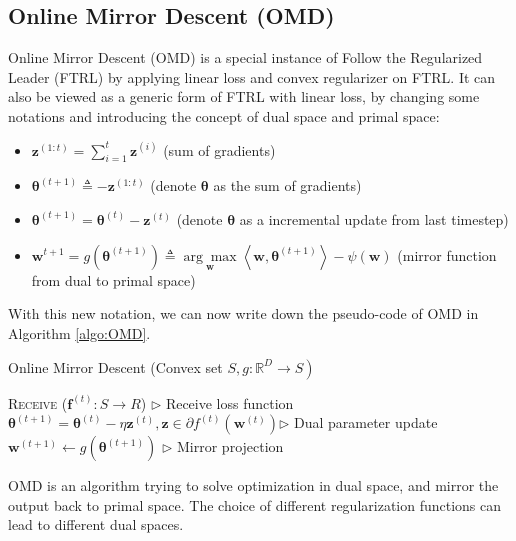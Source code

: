 \documentclass[11pt]{article}
\begin{document}
\subsection{Online Mirror Descent (OMD)}
Online Mirror Descent (OMD) is a special instance of Follow the Regularized Leader (FTRL) by applying linear loss and convex regularizer on FTRL. It can also be viewed as a generic form of FTRL with linear loss, by changing some notations and introducing the concept of dual space and primal space:
\begin{itemize}
    \item $\boldsymbol{z}^{(1: t)}=\sum_{i=1}^{t} \boldsymbol{z}^{(i)}$ (sum of gradients)
    \item $\boldsymbol{\theta}^{(t+1)} \triangleq-\boldsymbol{z}^{(1: t)}$ (denote $\boldsymbol{\theta}$ as the sum of gradients)
    \item $\boldsymbol{\theta}^{(t+1)}=\boldsymbol{\theta}^{(t)}-\boldsymbol{z}^{(t)}$ (denote $\boldsymbol{\theta}$ as a incremental update from last timestep)
    \item $\boldsymbol{w}^{t+1} = g\left(\boldsymbol{\theta}^{(t+1)}\right) \triangleq \underset{\boldsymbol{w}}{\arg \max }\left\langle\boldsymbol{w}, \boldsymbol{\theta}^{(t+1)}\right\rangle-\psi(\boldsymbol{w})$ (mirror function from dual to primal space)
\end{itemize}
With this new notation, we can now write down the pseudo-code of OMD in Algorithm \ref{algo:OMD}.
\begin{algorithm}[H]
\caption{Online Mirror Descent (Convex set $\left.S, g: \mathbb{R}^{D} \rightarrow S\right)$}
\label{algo:OMD}
\begin{algorithmic}[1]
\STATE \textsc{Receive} ($\textbf{f}^{(t)}: S\rightarrow R$) \hfill $\triangleright$ Receive loss function
\STATE  $\boldsymbol{\theta}^{(t+1)}=\boldsymbol{\theta}^{(t)}-\eta \boldsymbol{z}^{(t)}, \boldsymbol{z} \in \partial f^{(t)}\left(\boldsymbol{w}^{(t)}\right)$\hfill $\triangleright$ Dual parameter update
\STATE  $\boldsymbol{w}^{(t+1)} \leftarrow g\left(\boldsymbol{\theta}^{(t+1)}\right)$ \hfill $\triangleright$ Mirror projection
\ENDFOR
\end{algorithmic}
\end{algorithm}
OMD is an algorithm trying to solve optimization in dual space, and mirror the output back to primal space. The choice of different regularization functions can lead to different dual spaces. 
\end{document}
